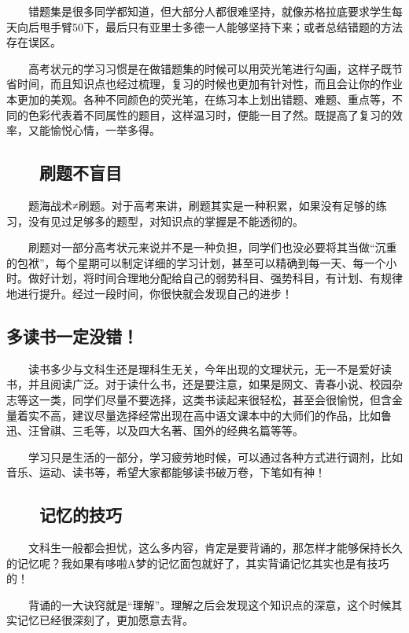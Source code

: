 \documentclass[11pt]{ctexart}
\begin{document}
{{{{　　错题集是很多同学都知道，但大部分人都很难坚持，就像苏格拉底要求学生每天向后甩手臂50下，最后只有亚里士多德一人能够坚持下来；或者总结错题的方法存在误区。

　　高考状元的学习习惯是在做错题集的时候可以用荧光笔进行勾画，这样子既节省时间，而且知识点也经过梳理，复习的时候也更加有针对性，而且会让你的作业本更加的美观。各种不同颜色的荧光笔，在练习本上划出错题、难题、重点等，不同的色彩代表着不同属性的题目，这样温习时，便能一目了然。既提高了复习的效率，又能愉悦心情，一举多得。

\subsection{　　刷题不盲目}
\label{sec:orgd6880f1}

　　题海战术≠刷题。对于高考来讲，刷题其实是一种积累，如果没有足够的练习，没有见过足够多的题型，对知识点的掌握是不能透彻的。

　　刷题对一部分高考状元来说并不是一种负担，同学们也没必要将其当做“沉重的包袱”，每个星期可以制定详细的学习计划，甚至可以精确到每一天、每一个小时。做好计划，将时间合理地分配给自己的弱势科目、强势科目，有计划、有规律地进行提升。经过一段时间，你很快就会发现自己的进步！

\subsection{多读书一定没错！}
\label{sec:org2759111}

　　读书多少与文科生还是理科生无关，今年出现的文理状元，无一不是爱好读书，并且阅读广泛。对于读什么书，还是要注意，如果是网文、青春小说、校园杂志等这一类，同学们尽量不要选择，这类书读起来很轻松，甚至会很愉悦，但含金量着实不高，建议尽量选择经常出现在高中语文课本中的大师们的作品，比如鲁迅、汪曾祺、三毛等，以及四大名著、国外的经典名篇等等。

　　学习只是生活的一部分，学习疲劳地时候，可以通过各种方式进行调剂，比如音乐、运动、读书等，希望大家都能够读书破万卷，下笔如有神！

\subsection{　　记忆的技巧}
\label{sec:orgece1d55}

　　文科生一般都会担忧，这么多内容，肯定是要背诵的，那怎样才能够保持长久的记忆呢？我如果有哆啦A梦的记忆面包就好了，其实背诵记忆其实也是有技巧的！

　　背诵的一大诀窍就是“理解”。理解之后会发现这个知识点的深意，这个时候其实记忆已经很深刻了，更加愿意去背。

}}}}
\end{document}
